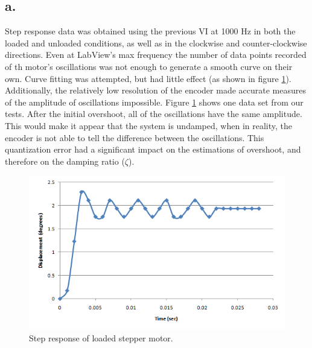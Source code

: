 \documentclass{article}
\theoremstyle{plain}
\theoremstyle{definition}
\theoremstyle{remark}
\begin{document}
\subsection*{a.}
Step response data was obtained using the previous VI at 1000 Hz in both the loaded and unloaded conditions, as well as in the clockwise and counter-clockwise directions. Even at LabView's max frequency the number of data points recorded of th motor's oscillations was not enough to generate a smooth curve on their own. Curve fitting was attempted, but had little effect (as shown in figure \ref{q3a_1}). Additionally, the relatively low resolution of the encoder made accurate measures of the amplitude of oscillations impossible. Figure \ref{q3a_1} shows one data set from our tests. After the initial overshoot, all of the oscillations have the same amplitude. This would make it appear that the system is undamped, when in reality, the encoder is not able to tell the difference between the oscillations. This quantization error had a significant impact on the estimations of overshoot, and therefore on the damping ratio ($\zeta$).\\

\begin{figure}[hbt]
\begin{center}
\includegraphics[width = 14cm]{StepResponse.png}
\caption{Step response of loaded stepper motor.}
\label{q3a_1}
\end{center}
\end{figure}
\end{document}
